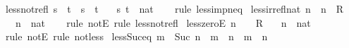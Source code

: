\begin{isabellebody}
\endisatagproof
{\isafoldproof}%
%
\isadelimproof
\isanewline
%
\endisadelimproof
\isanewline
{}\isamarkupfalse%
\ less{\isacharunderscore}{\kern0pt}not{\isacharunderscore}{\kern0pt}refl{}{\isacharcolon}{\kern0pt}\ {\isachardoublequoteopen}s\ {\isacharless}{\kern0pt}\ t\ {\isasymLongrightarrow}\ s\ {\isasymnoteq}\ t{\isachardoublequoteclose}\isanewline
\ \ \ s\ t\ {\isacharcolon}{\kern0pt}{\isacharcolon}{\kern0pt}\ nat\isanewline
%
\isadelimproof
\ \ %
\endisadelimproof
%
\isatagproof
{}\isamarkupfalse%
\ {\isacharparenleft}{\kern0pt}rule\ less{\isacharunderscore}{\kern0pt}imp{\isacharunderscore}{\kern0pt}neq{\isacharparenright}{\kern0pt}%
\endisatagproof
{\isafoldproof}%
%
\isadelimproof
\isanewline
%
\endisadelimproof
\isanewline
{}\isamarkupfalse%
\ less{\isacharunderscore}{\kern0pt}irrefl{\isacharunderscore}{\kern0pt}nat{\isacharcolon}{\kern0pt}\ {\isachardoublequoteopen}n\ {\isacharless}{\kern0pt}\ n\ {\isasymLongrightarrow}\ R{\isachardoublequoteclose}\isanewline
\ \ \ n\ {\isacharcolon}{\kern0pt}{\isacharcolon}{\kern0pt}\ nat\isanewline
%
\isadelimproof
\ \ %
\endisadelimproof
%
\isatagproof
{}\isamarkupfalse%
\ {\isacharparenleft}{\kern0pt}rule\ notE{\isacharcomma}{\kern0pt}\ rule\ less{\isacharunderscore}{\kern0pt}not{\isacharunderscore}{\kern0pt}refl{\isacharparenright}{\kern0pt}%
\endisatagproof
{\isafoldproof}%
%
\isadelimproof
\isanewline
%
\endisadelimproof
\isanewline
{}\isamarkupfalse%
\ less{\isacharunderscore}{\kern0pt}zeroE{\isacharcolon}{\kern0pt}\ {\isachardoublequoteopen}n\ {\isacharless}{\kern0pt}\ {}\ {\isasymLongrightarrow}\ R{\isachardoublequoteclose}\isanewline
\ \ \ n\ {\isacharcolon}{\kern0pt}{\isacharcolon}{\kern0pt}\ nat\isanewline
%
\isadelimproof
\ \ %
\endisadelimproof
%
\isatagproof
{}\isamarkupfalse%
\ {\isacharparenleft}{\kern0pt}rule\ notE{\isacharparenright}{\kern0pt}\ {\isacharparenleft}{\kern0pt}rule\ not{\isacharunderscore}{\kern0pt}less{}{\isacharparenright}{\kern0pt}%
\endisatagproof
{\isafoldproof}%
%
\isadelimproof
\isanewline
%
\endisadelimproof
\isanewline
{}\isamarkupfalse%
\ less{\isacharunderscore}{\kern0pt}Suc{\isacharunderscore}{\kern0pt}eq{\isacharcolon}{\kern0pt}\ {\isachardoublequoteopen}m\ {\isacharless}{\kern0pt}\ Suc\ n\ {\isasymlongleftrightarrow}\ m\ {\isacharless}{\kern0pt}\ n\ {\isasymor}\ m\ {\isacharequal}{\kern0pt}\ n{\isachardoublequoteclose}\isanewline
%
\isadelimproof
\ \ %
\endisadelimproof
%
\isatagproof

\end{isabellebody}

